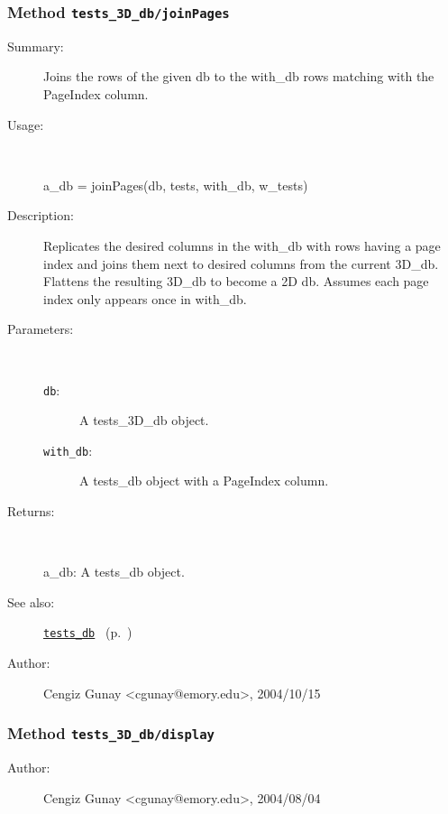 \subsubsection[Method \texttt{joinPages}]{Method \texttt{tests\_3D\_db/joinPages}}%
%
\label{ref_tests_3D_db__joinPages}%
\hypertarget{ref_tests_3D_db__joinPages}{}%
\begin{description}
\item[Summary:]Joins the rows of the given db to the with\_db rows matching with the PageIndex
 	column.
%
\item[Usage:]~%
\begin{lyxcode}%
a\_db = joinPages(db, tests, with\_db, w\_tests)
%
\end{lyxcode}%
%
\item[Description:]%
Replicates the desired columns in the with\_db with rows having a 
 page index and joins them next to desired columns from the current 3D\_db. Flattens 
 the resulting 3D\_db to become a 2D db. Assumes each page index only 
 appears once in with\_db.
\item[Parameters:]~
\begin{description}%
\item[\texttt{db}:]
 A tests\_3D\_db object.
\item[\texttt{with\_db}:]
 A tests\_db object with a PageIndex column.
\end{description}%
%
\item[Returns:]~

	a\_db: A tests\_db object.
%
%
\item[See also:]%
\hyperlink{ref_tests_db}{\texttt{tests\_db}}%
\ (p.~\pageref{ref_tests_db})%
%
%
\item[Author:]%
Cengiz Gunay <cgunay@emory.edu>, 2004/10/15%
\end{description}
\methodline%
\subsubsection[Method \texttt{display}]{Method \texttt{tests\_3D\_db/display}}%
%
\label{ref_tests_3D_db__display}%
\hypertarget{ref_tests_3D_db__display}{}%
\begin{description}
%
%
%
%
%
%
%
\item[Author:]%
Cengiz Gunay <cgunay@emory.edu>, 2004/08/04%
\end{description}
\methodline%

